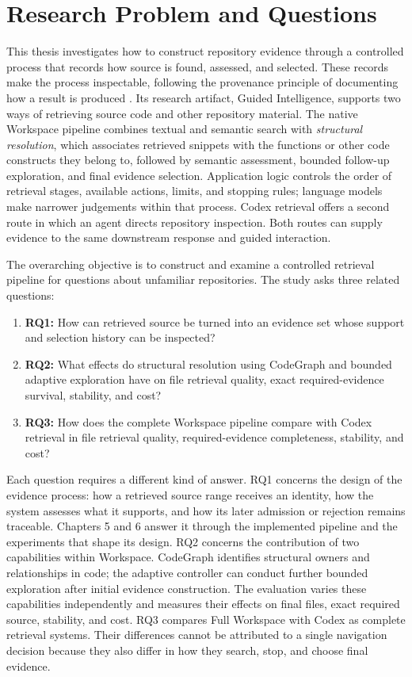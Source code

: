 \section{Research Problem and Questions}\label{sec:research-problem-and-questions}

This thesis investigates how to construct repository evidence through a controlled process that records how source is found, assessed, and selected. These records make the process inspectable, following the provenance principle of documenting how a result is produced \textcite{W3C2013PROV}. Its research artifact, Guided Intelligence, supports two ways of retrieving source code and other repository material. The native Workspace pipeline combines textual and semantic search with \emph{structural resolution}, which associates retrieved snippets with the functions or other code constructs they belong to, followed by semantic assessment, bounded follow-up exploration, and final evidence selection. Application logic controls the order of retrieval stages, available actions, limits, and stopping rules; language models make narrower judgements within that process. Codex retrieval offers a second route in which an agent directs repository inspection. Both routes can supply evidence to the same downstream response and guided interaction.

The overarching objective is to construct and examine a controlled retrieval pipeline for questions about unfamiliar repositories. The study asks three related questions:

\begin{enumerate}
\item \textbf{RQ1:} How can retrieved source be turned into an evidence set whose support and selection history can be inspected?
\item \textbf{RQ2:} What effects do structural resolution using CodeGraph and bounded adaptive exploration have on file retrieval quality, exact required-evidence survival, stability, and cost?
\item \textbf{RQ3:} How does the complete Workspace pipeline compare with Codex retrieval in file retrieval quality, required-evidence completeness, stability, and cost?
\end{enumerate}

Each question requires a different kind of answer. RQ1 concerns the design of the evidence process: how a retrieved source range receives an identity, how the system assesses what it supports, and how its later admission or rejection remains traceable. Chapters 5 and 6 answer it through the implemented pipeline and the experiments that shape its design. RQ2 concerns the contribution of two capabilities within Workspace. CodeGraph identifies structural owners and relationships in code; the adaptive controller can conduct further bounded exploration after initial evidence construction. The evaluation varies these capabilities independently and measures their effects on final files, exact required source, stability, and cost. RQ3 compares Full Workspace with Codex as complete retrieval systems. Their differences cannot be attributed to a single navigation decision because they also differ in how they search, stop, and choose final evidence.

